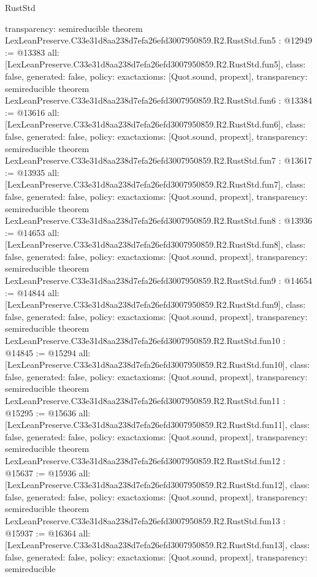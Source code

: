 \begin{lexlean}{RustStd}
\begin{coremodule}
{  transparency: semireducible
}
theorem LexLeanPreserve.C33e31d8aa238d7efa26efd3007950859.R2.RustStd.fun5 : @12949 := @13383 {
  all: [LexLeanPreserve.C33e31d8aa238d7efa26efd3007950859.R2.RustStd.fun5],
  class: false,
  generated: false,
  policy: exact{axioms: [Quot.sound, propext]},
  transparency: semireducible
}
theorem LexLeanPreserve.C33e31d8aa238d7efa26efd3007950859.R2.RustStd.fun6 : @13384 := @13616 {
  all: [LexLeanPreserve.C33e31d8aa238d7efa26efd3007950859.R2.RustStd.fun6],
  class: false,
  generated: false,
  policy: exact{axioms: [Quot.sound, propext]},
  transparency: semireducible
}
theorem LexLeanPreserve.C33e31d8aa238d7efa26efd3007950859.R2.RustStd.fun7 : @13617 := @13935 {
  all: [LexLeanPreserve.C33e31d8aa238d7efa26efd3007950859.R2.RustStd.fun7],
  class: false,
  generated: false,
  policy: exact{axioms: [Quot.sound, propext]},
  transparency: semireducible
}
theorem LexLeanPreserve.C33e31d8aa238d7efa26efd3007950859.R2.RustStd.fun8 : @13936 := @14653 {
  all: [LexLeanPreserve.C33e31d8aa238d7efa26efd3007950859.R2.RustStd.fun8],
  class: false,
  generated: false,
  policy: exact{axioms: [Quot.sound, propext]},
  transparency: semireducible
}
theorem LexLeanPreserve.C33e31d8aa238d7efa26efd3007950859.R2.RustStd.fun9 : @14654 := @14844 {
  all: [LexLeanPreserve.C33e31d8aa238d7efa26efd3007950859.R2.RustStd.fun9],
  class: false,
  generated: false,
  policy: exact{axioms: [Quot.sound, propext]},
  transparency: semireducible
}
theorem LexLeanPreserve.C33e31d8aa238d7efa26efd3007950859.R2.RustStd.fun10 : @14845 := @15294 {
  all: [LexLeanPreserve.C33e31d8aa238d7efa26efd3007950859.R2.RustStd.fun10],
  class: false,
  generated: false,
  policy: exact{axioms: [Quot.sound, propext]},
  transparency: semireducible
}
theorem LexLeanPreserve.C33e31d8aa238d7efa26efd3007950859.R2.RustStd.fun11 : @15295 := @15636 {
  all: [LexLeanPreserve.C33e31d8aa238d7efa26efd3007950859.R2.RustStd.fun11],
  class: false,
  generated: false,
  policy: exact{axioms: [Quot.sound, propext]},
  transparency: semireducible
}
theorem LexLeanPreserve.C33e31d8aa238d7efa26efd3007950859.R2.RustStd.fun12 : @15637 := @15936 {
  all: [LexLeanPreserve.C33e31d8aa238d7efa26efd3007950859.R2.RustStd.fun12],
  class: false,
  generated: false,
  policy: exact{axioms: [Quot.sound, propext]},
  transparency: semireducible
}
theorem LexLeanPreserve.C33e31d8aa238d7efa26efd3007950859.R2.RustStd.fun13 : @15937 := @16364 {
  all: [LexLeanPreserve.C33e31d8aa238d7efa26efd3007950859.R2.RustStd.fun13],
  class: false,
  generated: false,
  policy: exact{axioms: [Quot.sound, propext]},
  transparency: semireducible
}
\end{coremodule}
\end{lexlean}
